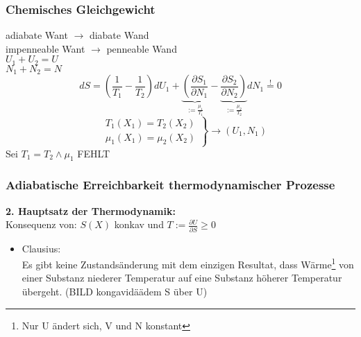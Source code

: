 \documentclass[10pt,article,colorback,accentcolor=tud9d]{scrartcl}
\begin{document}
\begin{fleqn}
\subsubsection{Chemisches Gleichgewicht}
adiabate Want $\rightarrow$ diabate Wand\\
impenneable Want $\rightarrow$ penneable Wand\\
$U_1+U_2=U$\\
$N_1 + N_2 = N$
\begin{equation}
  dS= \left(\frac{1}{T_1}-\frac{1}{T_2}\right)dU_1+\underbrace{\left(\frac{\partial S_1}{\partial N_1}\right.}_{:=\frac{\mu_1}{T_1}}
  -\underbrace{\left.\frac{\partial S_2}{\partial N_2}\right)}_{:=\frac{\mu_2}{T_2}}dN_1\stackrel{!}{=}0
\end{equation}
\begin{equation}
 \left. 
  \begin{aligned}
    &T_1(X_1)=T_2(X_2)\\
    &\mu_1(X_1)=\mu_2(X_2)
  \end{aligned}
 \right\} \rightarrow (U_1,N_1)
\end{equation}
Sei $T_1=T_2 \wedge \mu_1$ FEHLT
\subsubsection{Adiabatische Erreichbarkeit thermodynamischer Prozesse}
\textbf{2. Hauptsatz der Thermodynamik:}\\
Konsequenz von: $S(X)$ konkav und $T:=\frac{\partial U}{\partial S} \geq 0$\\
\begin{itemize}
  \item Clausius:\\
  Es gibt keine Zustandsänderung mit dem einzigen Resultat, dass Wärme\footnote{Nur U ändert sich, V und N konstant} von einer Substanz niederer Temperatur auf eine Substanz höherer Temperatur übergeht. (BILD kongavidäädem S über U)
\end{itemize}




\end{fleqn}
\end{document}
